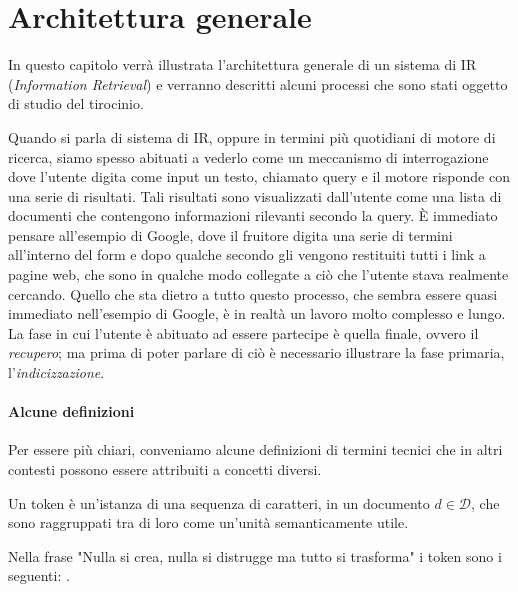 \section{Architettura generale}
In questo capitolo verrà illustrata l'architettura generale di un sistema di IR (\textit{Information Retrieval}) e verranno
descritti alcuni processi che sono stati oggetto di studio del tirocinio.

Quando si parla di sistema di IR, oppure in termini più quotidiani di motore di ricerca,
siamo spesso abituati a vederlo come un meccanismo di interrogazione dove l'utente
digita come input un testo, chiamato query e il motore risponde con una serie di risultati. Tali risultati
sono visualizzati dall'utente come una lista di documenti che contengono informazioni
rilevanti secondo la query.
\`E immediato pensare all'esempio di Google, dove il fruitore digita una serie di termini
all'interno del  form e dopo qualche secondo gli vengono restituiti tutti i link a pagine web, che
sono in qualche modo collegate a ciò che l'utente stava realmente cercando.
Quello che sta dietro a tutto questo processo, che sembra essere quasi immediato nell'esempio di Google, è
in realtà un lavoro molto complesso e lungo.
La fase in cui l'utente è abituato ad essere partecipe è quella finale, ovvero
il \textit{recupero}; ma prima di poter parlare di ciò è necessario illustrare la fase primaria, l'\textit{indicizzazione}.

\paragraph{Alcune definizioni}
Per essere più chiari, conveniamo alcune definizioni di termini tecnici che in altri contesti possono essere attribuiti
a concetti diversi.

\begin{definizione}\label{def:token}
	Un token è un'istanza di una sequenza di caratteri, in un documento $d \in \mathcal{D}$, che
	sono raggruppati tra di loro come un'unità semanticamente utile.
\end{definizione}

\begin{esempio}[tokenizzazione]
	Nella frase "Nulla si crea, nulla si distrugge ma tutto si trasforma" i token sono i seguenti:
	     
	   .
\end{esempio}

